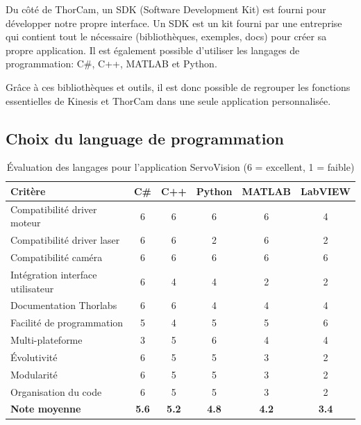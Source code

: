 Du côté de ThorCam, un SDK (Software Development Kit) est fourni pour développer notre propre interface. Un SDK est un kit fourni par une entreprise qui contient tout le nécessaire (bibliothèques, exemples, docs) pour créer sa propre application. Il est également possible d'utiliser les langages de programmation: C\#, C++, MATLAB et Python.

Grâce à ces bibliothèques et outils, il est donc possible de regrouper les fonctions essentielles de Kinesis et ThorCam dans une seule application personnalisée.
\subsection{Choix du language de programmation}
\begin{table}[H]
    \centering
    \begin{tabular}{|l|c|c|c|c|c|}
        \hline
        \textbf{Critère}                  & \textbf{C\#} & \textbf{C++} & \textbf{Python} & \textbf{MATLAB} & \textbf{LabVIEW} \\
        \hline
        Compatibilité driver moteur       & 6            & 6            & 6               & 6               & 4                \\
        Compatibilité driver laser        & 6            & 6            & 2               & 6               & 2                \\
        Compatibilité caméra              & 6            & 6            & 6               & 6               & 6                \\
        Intégration interface utilisateur & 6            & 4            & 4               & 2               & 2                \\
        Documentation Thorlabs            & 6            & 6            & 4               & 4               & 4                \\
        Facilité de programmation         & 5            & 4            & 5               & 5               & 6                \\
        Multi-plateforme                  & 3            & 5            & 6               & 4               & 4                \\
        Évolutivité                       & 6            & 5            & 5               & 3               & 2                \\
        Modularité                        & 6            & 5            & 5               & 3               & 2                \\
        Organisation du code              & 6            & 5            & 5               & 3               & 2                \\
        \hline
        \textbf{Note moyenne}             & \textbf{5.6} & \textbf{5.2} & \textbf{4.8}    & \textbf{4.2}    & \textbf{3.4}     \\
        \hline
    \end{tabular}
    \caption{Évaluation des langages pour l'application ServoVision (6 = excellent, 1 = faible)}
    \label{tab:langages}
\end{table}
